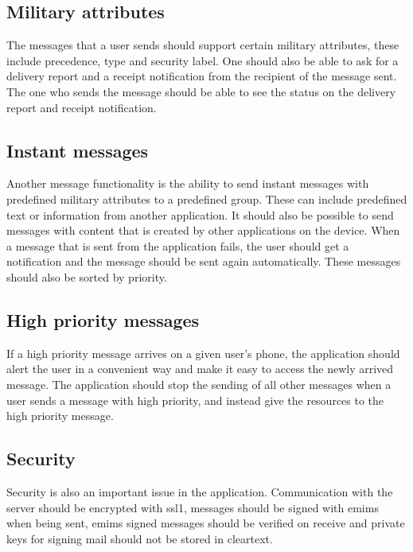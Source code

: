 \subsection{Military attributes}
The messages that a user sends should support certain military attributes, these include precedence, type and security label. 
\newline
\newline
One should also be able to ask for a delivery report and a receipt notification from the recipient of the message sent. The one who sends the message should be able to see the status on the delivery report and receipt notification.

\subsection{Instant messages}
Another message functionality is the ability to send instant messages with predefined military attributes to a predefined group. These can include predefined text or information from another application. It should also be possible to send messages with content that is created by other applications on the device.
\newline
\newline
When a message that is sent from the application fails, the user should get a notification and the message should be sent again automatically. These messages should also be sorted by priority.

\subsection{High priority messages}
If a high priority message arrives on a given user’s phone, the application should alert the user in a convenient way and make it easy to access the newly arrived message. The application should stop the sending of all other messages when a user sends a message with high priority, and instead give the resources to the high priority message.  

\subsection{Security}
Security is also an important issue in the application. Communication with the server should be encrypted with \gls{ssl1}, messages should be signed with \gls{emims} when being sent, \gls{emims} signed messages should be verified on receive and private keys for
signing mail should not be stored in cleartext.
